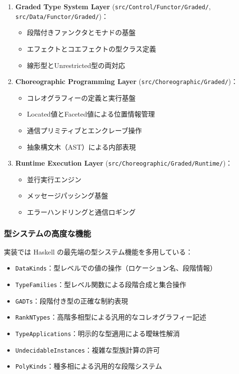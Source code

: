 \begin{enumerate}
\item \textbf{Graded Type System Layer} (\texttt{src/Control/Functor/Graded/}, \texttt{src/Data/Functor/Graded/})：
  \begin{itemize}
  \item 段階付きファンクタとモナドの基盤
  \item エフェクトとコエフェクトの型クラス定義
  \item 線形型とUnrestricted型の両対応
  \end{itemize}

\item \textbf{Choreographic Programming Layer} (\texttt{src/Choreographic/Graded/})：
  \begin{itemize}
  \item コレオグラフィーの定義と実行基盤
  \item Located値とFaceted値による位置情報管理
  \item 通信プリミティブとエンクレーブ操作
  \item 抽象構文木（AST）による内部表現
  \end{itemize}

\item \textbf{Runtime Execution Layer} (\texttt{src/Choreographic/Graded/Runtime/})：
  \begin{itemize}
  \item 並行実行エンジン
  \item メッセージパッシング基盤
  \item エラーハンドリングと通信ロギング
  \end{itemize}
\end{enumerate}

\subsubsection{型システムの高度な機能}

実装では Haskell の最先端の型システム機能を多用している：

\begin{itemize}
\item \texttt{DataKinds}：型レベルでの値の操作（ロケーション名、段階情報）
\item \texttt{TypeFamilies}：型レベル関数による段階合成と集合操作
\item \texttt{GADTs}：段階付き型の正確な制約表現
\item \texttt{RankNTypes}：高階多相型による汎用的なコレオグラフィー記述
\item \texttt{TypeApplications}：明示的な型適用による曖昧性解消
\item \texttt{UndecidableInstances}：複雑な型族計算の許可
\item \texttt{PolyKinds}：種多相による汎用的な段階システム
\end{itemize}

